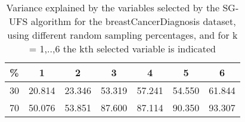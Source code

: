 \begin{table}
	\begin{center}
		\begin{tabular}{c c c c c c c}
			\% & 1 & 2 & 3 & 4 & 5 & 6 \\
			\hline
			30 & 20.814 & 23.346 & 53.319 & 57.241 & 54.550 & 61.844 \\
			70 & 50.076 & 53.851 & 87.600 & 87.114 & 90.350 & 93.307 \\
		\end{tabular}
	\end{center}
	\caption{Variance explained by the variables selected by the SG-UFS algorithm for the breastCancerDiagnosis dataset, using different random sampling percentages, and for k = 1,..,6 the kth selected variable is indicated}
\end{table}